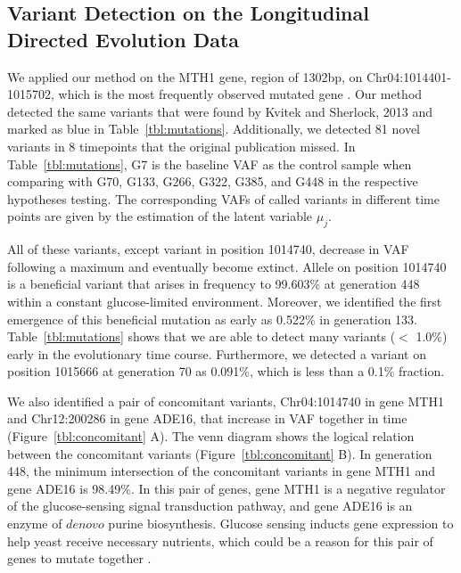 \documentclass[11pt,reqno]{amsart}
\begin{document}
\subsection{Variant Detection on the Longitudinal Directed Evolution Data}
We applied our method on the MTH1 gene, region of 1302bp, on Chr04:1014401-1015702, which is the most frequently observed mutated gene \citep{kvitek2013whole}.
Our method detected the same variants that were found by Kvitek and Sherlock, 2013 and marked as blue in Table~\ref{tbl:mutations}.
Additionally, we detected 81 novel variants in 8 timepoints that the original publication missed.
In Table~\ref{tbl:mutations}, G7 is the baseline VAF as the control sample when comparing with G70, G133, G266, G322, G385, and G448 in the respective hypotheses testing.
The corresponding VAFs of called variants in different time points are given by the estimation of the latent variable $\mu_j$.

All of these variants, except variant in position 1014740, decrease in VAF following a maximum and eventually become extinct.
Allele on position 1014740 is a beneficial variant that arises in frequency to 99.603\% at generation 448 within a constant glucose-limited environment.
Moreover, we identified the first emergence of this beneficial mutation as early as 0.522\% in generation 133.
Table~\ref{tbl:mutations} shows that we are able to detect many variants ($<$ 1.0\%) early in the evolutionary time course.
Furthermore, we detected a variant on position 1015666 at generation 70 as 0.091\%, which is less than a 0.1\% fraction.

We also identified a pair of concomitant variants, Chr04:1014740 in gene MTH1 and Chr12:200286 in gene ADE16, that increase in VAF together in time (Figure~\ref{tbl:concomitant} A).
The venn diagram shows the logical relation between the concomitant variants (Figure~\ref{tbl:concomitant} B).
In generation 448, the minimum intersection of the concomitant variants in gene MTH1 and gene ADE16 is 98.49\%.
In this pair of genes, gene MTH1 is a negative regulator of the glucose-sensing signal transduction pathway, and gene ADE16 is an enzyme of $\mathit{de novo}$ purine biosynthesis.
Glucose sensing inducts gene expression to help yeast receive necessary nutrients, which could be a reason for this pair of genes to mutate together \citep{johnston1999feasting}.
\end{document}
